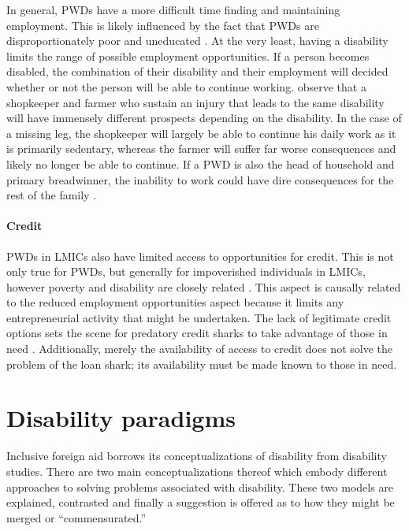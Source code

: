 \documentclass[a4paper]{article}
\begin{document}
In general, PWDs have a more difficult time finding and maintaining
employment. This is likely influenced by the fact that PWDs are
disproportionately poor and uneducated \citep{lamichhane2014nexus}. At the
very least, having a disability limits the range of possible employment
opportunities. If a person becomes disabled, the combination of their
disability and their employment will decided whether or not the person will be
able to continue working. \cite{chowdhury2006economics} observe that a
shopkeeper and farmer who sustain an injury that leads to the same disability
will have immensely different prospects depending on the disability. In the
case of a missing leg, the shopkeeper will largely be able to continue his
daily work as it is primarily sedentary, whereas the farmer will suffer far
worse consequences and likely no longer be able to continue. If a PWD is also
the head of household and primary breadwinner, the inability to work could
have dire consequences for the rest of the family \citep{world2011world}.

\paragraph{Credit}

PWDs in LMICs also have limited access to opportunities for credit. This is
not only true for PWDs, but generally for impoverished individuals in LMICs,
however poverty and disability are closely related
\citep{palmer2011disability}. This aspect is causally related to the reduced
employment opportunities aspect because it limits any entrepreneurial activity
that might be undertaken. The lack of legitimate credit options sets the scene
for predatory credit sharks to take advantage of those in need
\citep{beisland2017exploring}. Additionally, merely the availability of access
to credit does not solve the problem of the loan shark; its availability must
be made known to those in need.

\newpage
\section{Disability paradigms}

Inclusive foreign aid borrows its conceptualizations of disability from
disability studies. There are two main conceptualizations thereof which embody
different approaches to solving problems associated with disability. These two
models are explained, contrasted and finally a suggestion is offered as to how
they might be merged or ``commensurated.''
\end{document}
